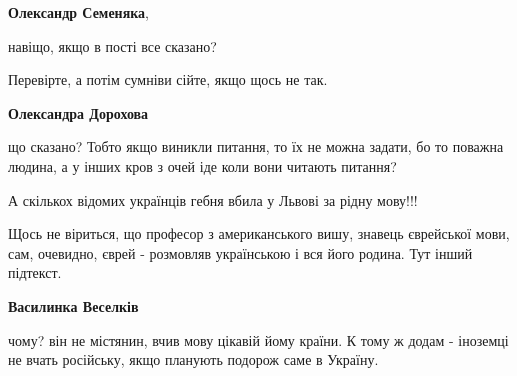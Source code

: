 \begin{itemize}
\begin{itemize}
\textbf{Олександр Семеняка}, 

навіщо, якщо в пості все сказано?

Перевірте, а потім сумніви сійте, якщо щось не так.

 
\textbf{Олександра Дорохова} 

що сказано? Тобто якщо виникли питання, то їх не можна задати, бо то поважна
людина, а у інших кров з очей іде коли вони читають питання?

\end{itemize}

 
А скількох відомих українців гебня вбила у Львові за рідну мову!!!

 

Щось не віриться, що професор з американського вишу, знавець єврейської мови,
сам, очевидно, єврей - розмовляв українською і вся його родина. Тут інший
підтекст.

\begin{itemize}
 
\textbf{Василинка Веселків} 

чому? він не містянин, вчив мову цікавій йому країни. К тому ж додам - іноземці
не вчать російську, якщо планують подорож саме в Україну.

 

\end{itemize}
\end{itemize}
